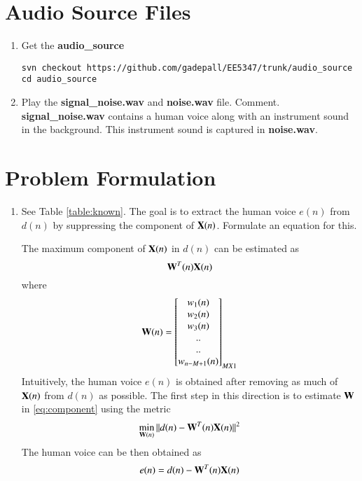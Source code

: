 \documentclass[journal,12pt,twocolumn]{IEEEtran}
\renewcommand\thesection{\arabic{section}}
\begin{document}
\section{Audio Source Files}
\begin{enumerate}[label=\thesection.\arabic*
,ref=\thesection.\theenumi]
\item Get the \textbf{audio\_source}
\begin{lstlisting}
svn checkout https://github.com/gadepall/EE5347/trunk/audio_source
cd audio_source
\end{lstlisting}
\item Play the \textbf{signal\_noise.wav} and \textbf{noise.wav} file. Comment.
\\
\solution
\textbf{signal\_noise.wav}  contains a human voice along 
with an instrument sound in the background.  This instrument sound
is captured in \textbf{noise.wav}.
\end{enumerate}
%
\section{Problem Formulation}
\begin{enumerate}[label=\thesection.\arabic*
,ref=\thesection.\theenumi]

\item See Table \ref{table:known}.  The goal is to extract the human voice $e(n)$ from $d(n)$ by suppressing the component of $\mathbf{X}(n)$.  Formulate 
an equation for this.
\begin{table}[!ht]
\centering
\small

\caption{}
\label{table:known}
\end{table}
%
\solution The  maximum component of $\mathbf{X}(n)$ in $d(n)$ can be estimated as
%
\begin{equation}
\label{eq:component}
\mathbf{W}^{T}(n)\mathbf{X}(n)
\end{equation}
where 
\begin{align}
 \mbf{W}(n)
 =
  \begin{bmatrix}
   w_1(n) \\ w_2(n)\\
   w_3(n) \\ $..$ \\ $..$ \\ w_{n-M+1}(n)  \end{bmatrix}_{M X 1}
\end{align}
%
Intuitively, the human voice $e(n)$ is obtained after removing as much of $\mathbf{X}(n)$ from $d(n)$ as 
possible. The first step in this direction is to estimate $\mathbf{W}$ in \eqref{eq:component} using the metric
\begin{equation}
\label{eq:prob_mse}
\min_{\mathbf{W}(n)}\, \lVert d(n)-\mathbf{W}^{T}(n)\mathbf{X}(n)\rVert^2
\end{equation}
%
The human voice can be then obtained as
%
\begin{align}
\label{eq:error}
e(n) = d(n)-\mathbf{W}^{T}(n)\mathbf{X}(n)
\end{align}
%
%
\end{enumerate}
\end{document}

